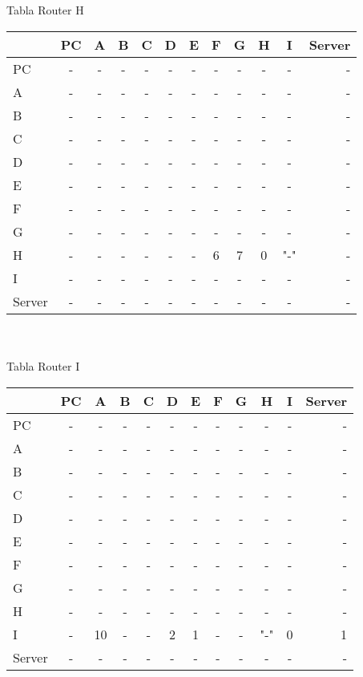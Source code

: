 \documentclass{article}
\begin{document}
\\
\\
Tabla Router H \\
\begin{tabular}{l*{10}{c}r}
              & PC & A & B & C & D & E & F & G & H & I & Server \\
\hline
PC             & - & - & - & - & - & - & - & - & - & - & - \\
A              & - & - & - & - & - & - & - & - & - & - & - \\
B              & - & - & - & - & - & - & - & - & - & - & - \\
C              & - & - & - & - & - & - & - & - & - & - & - \\
D              & - & - & - & - & - & - & - & - & - & - & - \\
E              & - & - & - & - & - & - & - & - & - & - & - \\
F              & - & - & - & - & - & - & - & - & - & - & - \\
G              & - & - & - & - & - & - & - & - & - & - & - \\
H              & - & - & - & - & - & - & 6 & 7 & 0 & "-" & -\\
I              & - & - & - & - & - & - & - & - & - & - & - \\
Server         & - & - & - & - & - & - & - & - & - & - & - \\

\end{tabular}
\\
\\
Tabla Router I \\
\begin{tabular}{l*{10}{c}r}
              & PC & A & B & C & D & E & F & G & H & I & Server \\
\hline
PC             & - & - & - & - & - & - & - & - & - & - & -\\
A              & - & - & - & - & - & - & - & - & - & - & -\\
B              & - & - & - & - & - & - & - & - & - & - & -\\
C              & - & - & - & - & - & - & - & - & - & - & -\\
D              & - & - & - & - & - & - & - & - & - & - & -\\
E              & - & - & - & - & - & - & - & - & - & - & -\\
F              & - & - & - & - & - & - & - & - & - & - & -\\
G              & - & - & - & - & - & - & - & - & - & - & -\\
H              & - & - & - & - & - & - & - & - & - & - & -\\
I              & - & 10 & - & - & 2 & 1 & - & - & "-" & 0 & 1\\
Server         & - & - & - & - & - & - & - & - & - & - & -\\

\end{tabular}
\end{document}
